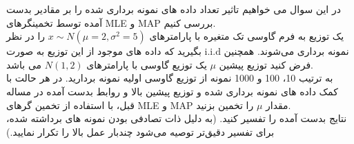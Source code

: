 در این سوال می خواهیم تاثیر تعداد داده های نمونه برداری شده را بر مقادیر بدست آمده توسط تخمینگرهای MLE و MAP بررسی کنیم.\\
یک توزیع به فرم گاوسی تک متغیره با پارامترهای 
$
x \sim N\left( {\mu  = 2,{\sigma ^2} = 5} \right)
$
را در نظر بگیرید که داده های موجود از این توزیع به صورت i.i.d نمونه برداری می‌شوند. همچنین فرض کنید توزیع پیشین $\mu $ یک توزیع گاوسی با پارامترهای 
$
N\left( {1,2} \right)
$
می باشد.\\
به ترتیب 10، 100 و 1000 نمونه از توزیع گاوسی اولیه نمونه بردارید. در هر حالت با کمک داده های نمونه برداری شده و توزیع پیشین بالا و روابط بدست آمده در مساله قبل، با استفاده از تخمین گرهای MLE و MAP مقدار $\mu $ را تخمین بزنید.\\
نتایج بدست آمده را تفسیر کنید. (به دلیل ذات تصادفی بودن نمونه های برداشته شده،‌ برای تفسیر دقیق‌تر توصیه می‌شود چندبار عمل بالا را تکرار نمایید.)
